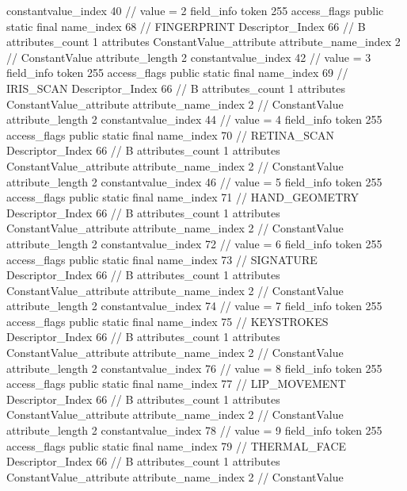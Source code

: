 {{{{{{{					constantvalue_index	40		// value = 2
				}
				}
			}
			field_info {
				token	255
				access_flags	public static final
				name_index	68		// FINGERPRINT
				Descriptor_Index	66		// B
				attributes_count	1
				attributes {
				ConstantValue_attribute {
					attribute_name_index	2		// ConstantValue
					attribute_length	2
					constantvalue_index	42		// value = 3
				}
				}
			}
			field_info {
				token	255
				access_flags	public static final
				name_index	69		// IRIS_SCAN
				Descriptor_Index	66		// B
				attributes_count	1
				attributes {
				ConstantValue_attribute {
					attribute_name_index	2		// ConstantValue
					attribute_length	2
					constantvalue_index	44		// value = 4
				}
				}
			}
			field_info {
				token	255
				access_flags	public static final
				name_index	70		// RETINA_SCAN
				Descriptor_Index	66		// B
				attributes_count	1
				attributes {
				ConstantValue_attribute {
					attribute_name_index	2		// ConstantValue
					attribute_length	2
					constantvalue_index	46		// value = 5
				}
				}
			}
			field_info {
				token	255
				access_flags	public static final
				name_index	71		// HAND_GEOMETRY
				Descriptor_Index	66		// B
				attributes_count	1
				attributes {
				ConstantValue_attribute {
					attribute_name_index	2		// ConstantValue
					attribute_length	2
					constantvalue_index	72		// value = 6
				}
				}
			}
			field_info {
				token	255
				access_flags	public static final
				name_index	73		// SIGNATURE
				Descriptor_Index	66		// B
				attributes_count	1
				attributes {
				ConstantValue_attribute {
					attribute_name_index	2		// ConstantValue
					attribute_length	2
					constantvalue_index	74		// value = 7
				}
				}
			}
			field_info {
				token	255
				access_flags	public static final
				name_index	75		// KEYSTROKES
				Descriptor_Index	66		// B
				attributes_count	1
				attributes {
				ConstantValue_attribute {
					attribute_name_index	2		// ConstantValue
					attribute_length	2
					constantvalue_index	76		// value = 8
				}
				}
			}
			field_info {
				token	255
				access_flags	public static final
				name_index	77		// LIP_MOVEMENT
				Descriptor_Index	66		// B
				attributes_count	1
				attributes {
				ConstantValue_attribute {
					attribute_name_index	2		// ConstantValue
					attribute_length	2
					constantvalue_index	78		// value = 9
				}
				}
			}
			field_info {
				token	255
				access_flags	public static final
				name_index	79		// THERMAL_FACE
				Descriptor_Index	66		// B
				attributes_count	1
				attributes {
				ConstantValue_attribute {
					attribute_name_index	2		// ConstantValue
}}}}}}}
